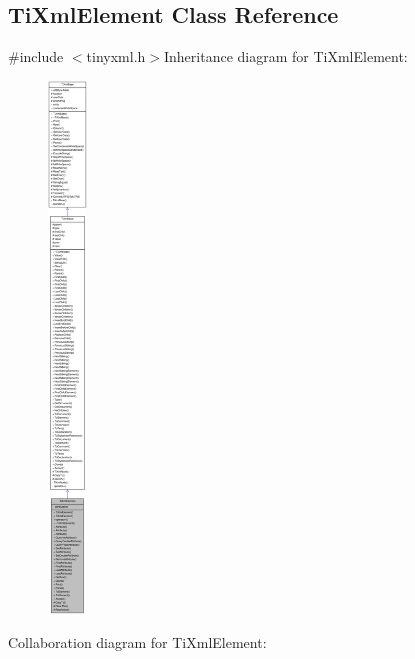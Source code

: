 \hypertarget{class_ti_xml_element}{
\subsection{TiXmlElement Class Reference}
\label{class_ti_xml_element}
}


{\ttfamily \#include $<$tinyxml.h$>$}Inheritance diagram for TiXmlElement:\nopagebreak
\begin{figure}[H]
\begin{center}
\leavevmode
\includegraphics[height=400pt]{class_ti_xml_element__inherit__graph}
\end{center}
\end{figure}
Collaboration diagram for TiXmlElement:\nopagebreak
